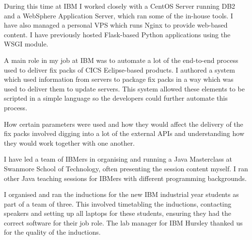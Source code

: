 \documentclass[10pt,stdletter,dateno,sigleft]{newlfm} %
\begin{document}
\begin{newlfm}
During this time at IBM I worked closely with a CentOS Server running DB2 and a WebSphere 
Application Server, which ran some of the in-house tools. I have also managed a
personal VPS which runs Nginx to provide web-based content. I have previously
hosted Flask-based Python applications using the WSGI module.

A main role in my job at IBM was to automate a lot of the end-to-end process 
used to deliver fix packs of CICS Eclipse-based products. I authored a system which used
information from servers to package fix packs in a way which was used to deliver them to update servers.
This system allowed these elements to be scripted in a simple language so
the developers could further automate this process.

How certain parameters were used and how they would affect the delivery of the fix
packs involved digging into a lot of the external APIs and understanding 
how they would work together with one another.

I have led a team of IBMers in organising and running a Java Masterclass
at Swanmore School of Technology, often presenting the session content myself.
I ran other Java teaching sessions for IBMers with different programming
backgrounds.

I organised and ran the inductions for the new IBM industrial year students as
part of a team of three. This involved timetabling the inductions, contacting
speakers and setting up all laptops for these students, ensuring they had the
correct software for their job role. The lab manager for IBM Hursley 
thanked us for the quality of the inductions.




\end{newlfm}
\end{document}
